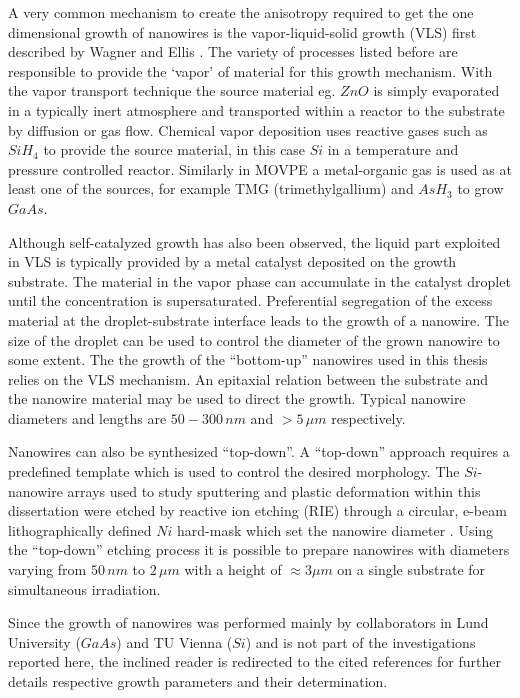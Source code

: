 A very common mechanism to create the anisotropy required to get the one dimensional growth of nanowires is the vapor-liquid-solid growth (VLS) first described by Wagner and Ellis \cite{wagner_vapor-liquid-solid_1964}. The variety of processes listed before are responsible to provide the `vapor' of material for this growth mechanism. With the vapor transport technique the source material eg. $ZnO$ is simply evaporated in a typically inert atmosphere and transported within a reactor to the substrate by diffusion or gas flow. Chemical vapor deposition uses reactive gases such as $SiH_4$ to provide the source material, in this case $Si$ in a temperature and pressure controlled reactor. Similarly in MOVPE a metal-organic gas is used as at least one of the sources, for example TMG (trimethylgallium) and $AsH_3$ to grow $GaAs$.

Although self-catalyzed growth has also been observed, the liquid part exploited in VLS is typically provided by a metal catalyst deposited on the growth substrate. The material in the vapor phase can accumulate in the catalyst droplet until the concentration is supersaturated. Preferential segregation of the excess material at the droplet-substrate interface leads to the growth of a nanowire. The size of the droplet can be used to control the diameter of the grown nanowire to some extent. The the growth of the ``bottom-up'' nanowires used in this thesis relies on the VLS mechanism. An epitaxial relation between the substrate and the nanowire material may be used to direct the growth. Typical nanowire diameters and lengths are $50 - 300\,nm$ and $> 5\,\mu m$ respectively.

Nanowires can also be synthesized ``top-down''. A ``top-down'' approach requires a predefined template which is used to control the desired morphology. The $Si$-nanowire arrays used to study sputtering and plastic deformation within this dissertation were etched by reactive ion etching (RIE) through a circular, e-beam lithographically defined $Ni$ hard-mask which set the nanowire diameter . Using the ``top-down'' etching process it is possible to prepare nanowires with diameters varying from $50\,nm$ to $2\,\mu m$ with a height of $\approx 3\mu m$ on a single substrate for simultaneous irradiation. 

Since the growth of nanowires was performed mainly by collaborators in Lund University ($GaAs$) and TU Vienna ($Si$) and is not part of the investigations reported here, the inclined reader is redirected to the cited references for further details respective growth parameters and their determination.

